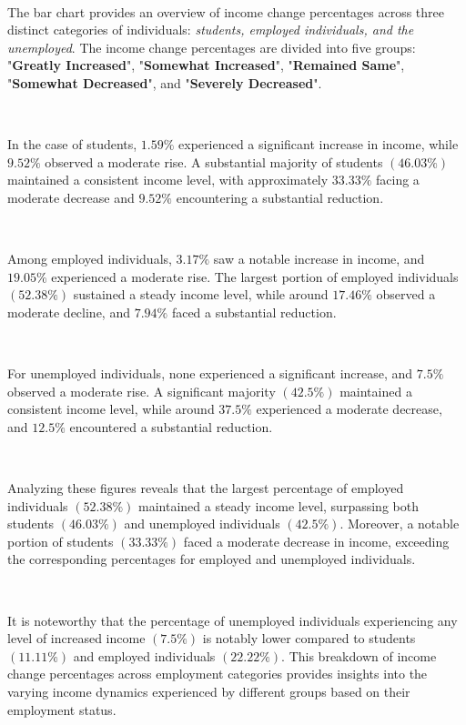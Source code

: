 \ 

The bar chart provides an overview of income change percentages across three distinct categories of individuals: \textit{students, employed individuals, and the unemployed}. The income change percentages are divided into five groups: "\textbf{Greatly Increased}", "\textbf{Somewhat Increased}", "\textbf{Remained Same}", "\textbf{Somewhat Decreased}", and "\textbf{Severely Decreased}".

\ 

In the case of students, $1.59\%$ experienced a significant increase in income, while $9.52\%$ observed a moderate rise. A substantial majority of students $(46.03\%)$ maintained a consistent income level, with approximately $33.33\%$ facing a moderate decrease and $9.52\%$ encountering a substantial reduction.

\ 

Among employed individuals, $3.17\%$ saw a notable increase in income, and $19.05\%$ experienced a moderate rise. The largest portion of employed individuals $(52.38\%)$ sustained a steady income level, while around $17.46\%$ observed a moderate decline, and $7.94\%$ faced a substantial reduction.

\

For unemployed individuals, none experienced a significant increase, and $7.5\%$ observed a moderate rise. A significant majority $(42.5\%)$ maintained a consistent income level, while around $37.5\%$ experienced a moderate decrease, and $12.5\%$ encountered a substantial reduction.

\ 

Analyzing these figures reveals that the largest percentage of employed individuals $(52.38\%)$ maintained a steady income level, surpassing both students $(46.03\%)$ and unemployed individuals $(42.5\%)$. Moreover, a notable portion of students $(33.33\%)$ faced a moderate decrease in income, exceeding the corresponding percentages for employed and unemployed individuals.

\ 

It is noteworthy that the percentage of unemployed individuals experiencing any level of increased income $(7.5\%)$ is notably lower compared to students $(11.11\%)$ and employed individuals $(22.22\%)$. This breakdown of income change percentages across employment categories provides insights into the varying income dynamics experienced by different groups based on their employment status.

\newpage

